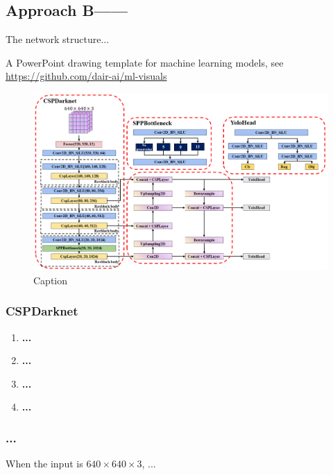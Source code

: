 \subsection{Approach B——}
The network structure...

A PowerPoint drawing template for machine learning models, see \url{https://github.com/dair-ai/ml-visuals}

\begin{figure}[!ht]
    \centering
    \includegraphics[width=1.1\textwidth]{images/Yolox_structure.png}
    \caption{Caption}
    \label{fig:}
\end{figure}


\subsubsection{CSPDarknet}

\begin{enumerate}
    \item \textbf{...} 
    
    \item \textbf{...} 
    
    \item \textbf{...} 
    
    \item \textbf{...} 
\end{enumerate}


\subsubsection{...}
When the input is $640\times 640\times 3$, ...

